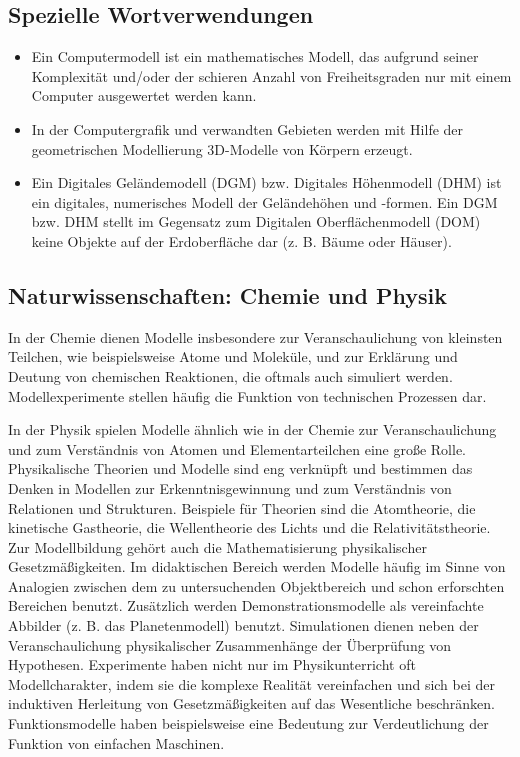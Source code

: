 \documentclass[a4paper, 12pt]{scrartcl}
\begin{document}
\subsection*{Spezielle Wortverwendungen}
\begin{itemize}
    \item Ein Computermodell ist ein mathematisches Modell, das aufgrund seiner Komplexität und/oder der schieren Anzahl von Freiheitsgraden nur mit einem Computer ausgewertet werden kann.
    \item In der Computergrafik und verwandten Gebieten werden mit Hilfe der geometrischen Modellierung 3D-Modelle von Körpern erzeugt.
    \item Ein Digitales Geländemodell (DGM) bzw. Digitales Höhenmodell (DHM) ist ein digitales, numerisches Modell der Geländehöhen und -formen. Ein DGM bzw. DHM stellt im Gegensatz zum Digitalen Oberflächenmodell (DOM) keine Objekte auf der Erdoberfläche dar (z. B. Bäume oder Häuser).
\end{itemize}

\subsection{Naturwissenschaften: Chemie und Physik}
In der Chemie dienen Modelle insbesondere zur Veranschaulichung von kleinsten Teilchen, wie beispielsweise Atome und Moleküle, und zur Erklärung und Deutung von chemischen Reaktionen, die oftmals auch simuliert werden. Modellexperimente stellen häufig die Funktion von technischen Prozessen dar.

In der Physik spielen Modelle ähnlich wie in der Chemie zur Veranschaulichung und zum Verständnis von Atomen und Elementarteilchen eine große Rolle. Physikalische Theorien und Modelle sind eng verknüpft und bestimmen das Denken in Modellen zur Erkenntnisgewinnung und zum Verständnis von Relationen und Strukturen. Beispiele für Theorien sind die Atomtheorie, die kinetische Gastheorie, die Wellentheorie des Lichts und die Relativitätstheorie. Zur Modellbildung gehört auch die Mathematisierung physikalischer Gesetzmäßigkeiten. Im didaktischen Bereich werden Modelle häufig im Sinne von Analogien zwischen dem zu untersuchenden Objektbereich und schon erforschten Bereichen benutzt. Zusätzlich werden Demonstrationsmodelle als vereinfachte Abbilder (z. B. das Planetenmodell) benutzt. Simulationen dienen neben der Veranschaulichung physikalischer Zusammenhänge der Überprüfung von Hypothesen. Experimente haben nicht nur im Physikunterricht oft Modellcharakter, indem sie die komplexe Realität vereinfachen und sich bei der induktiven Herleitung von Gesetzmäßigkeiten auf das Wesentliche beschränken. Funktionsmodelle haben beispielsweise eine Bedeutung zur Verdeutlichung der Funktion von einfachen Maschinen.
\end{document}
